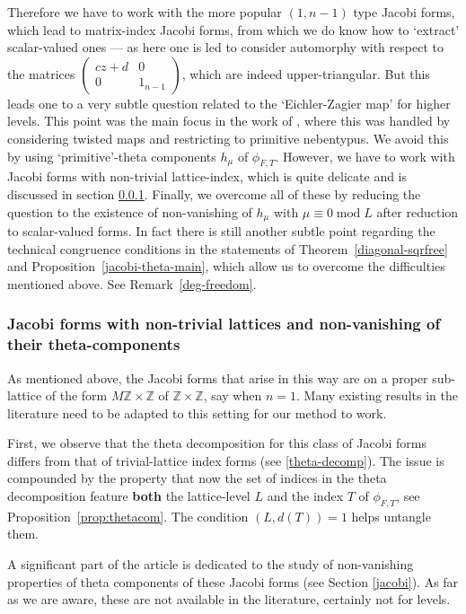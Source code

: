 \documentclass[11pt]{amsart}
\numberwithin{equation}{section}
\newcommand{\psmb}{\left( \begin{smallmatrix}}
\newcommand{\psme}{ \end{smallmatrix} \right)}
\renewcommand*{\mod}{\operatorname{mod}}
\newcommand{\z}{\mathbb{Z}}
\begin{document}
Therefore we have to work with the more popular $(1,n-1)$ type Jacobi forms, which lead to matrix-index Jacobi forms, from which we do know how to `extract' scalar-valued ones --- as here one is led to consider automorphy with respect to the matrices $\psmb  cz+d & 0 \\ 0 & 1_{n-1}\psme$, which are indeed upper-triangular. But this leads one to a very subtle question related to the `Eichler-Zagier map' for higher levels. This point was the main focus in the work of \cite{washburn2025certain}, where this was handled by considering twisted maps and restricting to primitive nebentypus. We avoid this by using `primitive'-theta components $h_\mu$ of $\phi_{F,T}$. However, we have to work with Jacobi forms with non-trivial lattice-index, which is quite delicate and is discussed in section \ref{sec:JacobiIntro}. Finally, we overcome all of these by reducing the question to the existence of non-vanishing of $h_{\mu}$ with $\mu \equiv 0 \mod L$ after reduction to scalar-valued forms.
In fact there is still another subtle point regarding the technical congruence conditions in the statements of Theorem~\ref{diagonal-sqrfree} and Proposition~\ref{jacobi-theta-main}, which allow us to overcome the difficulties mentioned above. See Remark~\ref{deg-freedom}. 


\subsubsection{Jacobi forms with non-trivial lattices and non-vanishing of their theta-components}\label{sec:JacobiIntro}
As mentioned above, the Jacobi forms that arise in this way are on a proper sub-lattice of the form $M \z \times \z$ of $\z \times \z$, say when $n=1$. Many existing results in the literature need to be adapted to this setting for our method to work. 

First, we observe that the theta decomposition for this class of Jacobi forms differs from that of trivial-lattice index forms (see \eqref{theta-decomp}). The issue is compounded by the property that now the set of indices in the theta decomposition feature {\bf  both} the lattice-level $L$ and the index $T$ of $\phi_{F,T}$, see Proposition~\ref{prop:thetacom}. The condition $(L, d(T))=1$ helps untangle them.


A significant part of the article is dedicated to the study of non-vanishing properties of theta components of these Jacobi forms (see Section \ref{jacobi}). As far as we are aware, these are not available in the literature, certainly not for levels. 
\end{document}
